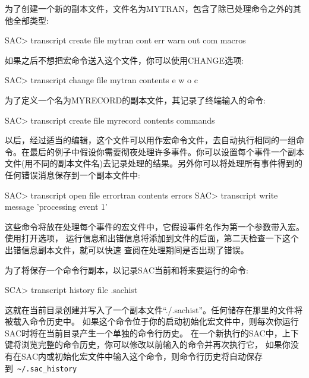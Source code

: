 为了创建一个新的副本文件，文件名为MYTRAN，包含了除已处理命令之外的其他全部类型:
\begin{SACCode}
SAC> transcript create file mytran cont err warn out com macros
\end{SACCode}

如果之后不想把宏命令送入这个文件，你可以使用CHANGE选项:
\begin{SACCode}
SAC> transcript change file mytran contents e w o c
\end{SACCode}

为了定义一个名为MYRECORD的副本文件，其记录了终端输入的命令:
\begin{SACCode}
SAC> transcript create file myrecord contents commands
\end{SACCode}

以后，经过适当的编辑，这个文件可以用作宏命令文件，去自动执行相同的一组命令。在最后的例子中假设你需要彻夜处理许多事件。你可以设置每个事件一个副本文件(用不同的副本文件名)去记录处理的结果。另外你可以将处理所有事件得到的任何错误消息保存到一个副本文件中:
\begin{SACCode}
SAC> transcript open file errortran contents errors
SAC> transcript write message 'processing event 1'
\end{SACCode}

这些命令将放在处理每个事件的宏文件中，它假设事件名作为第一个参数带入宏。使用打开选项，
运行信息和出错信息将添加到文件的后面，第二天检查一下这个出错信息副本文件，就可以快速
查阅在处理期间是否出现了错误。

为了将保存一个命令行副本，以记录SAC当前和将来要运行的命令:
\begin{SACCode}
SCA> transcript history file .sachist
\end{SACCode}
这就在当前目录创建并写入了一个副本文件``./.sachist''。任何储存在那里的文件将被载入命令历史中。
如果这个命令位于你的启动初始化宏文件中，则每次你运行SAC时将在当前目录产生一个单独的命令行历史。
在一个新执行的SAC中，上下键将浏览完整的命令历史，你可以修改以前输入的命令并再次执行它，
如果你没有在SAC内或初始化宏文件中输入这个命令，则命令行历史将自动保存到~\verb+~/.sac_history+
